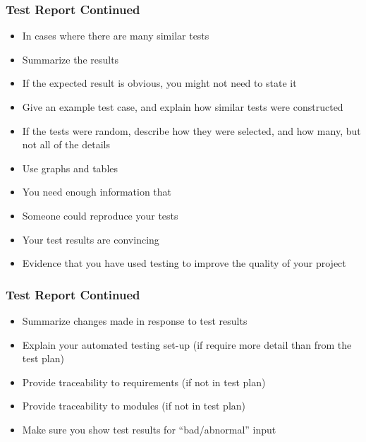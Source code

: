 \documentclass[t,12pt,numbers,fleqn]{beamer}
\begin{document}

\begin{frame}
\frametitle{Test Report Continued}
\begin{itemize}
\item In cases where there are many similar tests
\bi
\item Summarize the results
\item If the expected result is obvious, you might not need to state it
\item Give an example test case, and explain how similar tests were constructed
\item If the tests were random, describe how they were selected, and how many,
  but not all of the details
\item Use graphs and tables
\item You need enough information that
\bi
\item Someone could reproduce your tests
\item Your test results are convincing
\item Evidence that you have used testing to improve the quality of your project
\ei
\ei
\end{itemize}
\end{frame}


\begin{frame}
\frametitle{Test Report Continued}
\begin{itemize}
\item Summarize changes made in response to test results
\item Explain your automated testing set-up (if require more detail than from
  the test plan)
\item Provide traceability to requirements (if not in test plan)
\item Provide traceability to modules (if not in test plan)
\item Make sure you show test results for ``bad/abnormal'' input
\end{itemize}
\end{frame}

\end{document}

